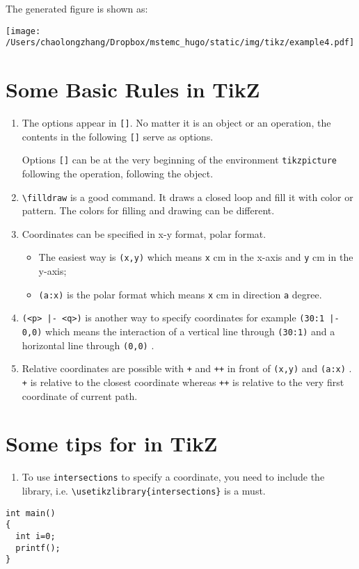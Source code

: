 \documentclass[koma,a4paper,utopia,12pt,listings-color,microtype,paralist,colorlinks,urlcolor=red]{org-article}
\begin{document}
The generated figure is shown as:
\begin{center}
\texttt{[image: /Users/chaolongzhang/Dropbox/mstemc\_hugo/static/img/tikz/example4.pdf]}
\end{center}


\section{Some Basic Rules in TikZ}
\label{sec:org628b561}


\begin{enumerate}
\item The options appear in \texttt{[]}. No matter it is an object or an operation, the
contents in the following  \texttt{[]} serve as options.

Options \texttt{[]} can be at the very beginning of the environment \texttt{tikzpicture}
following the operation, following the object.

\item \texttt{\textbackslash{}filldraw} is a good command. It draws a closed loop and fill it with color or
pattern. The colors for filling and drawing can be different.

\item Coordinates can be specified in x-y format, polar format.
\begin{itemize}
\item The easiest way is \texttt{(x,y)} which means \texttt{x} cm in the x-axis and \texttt{y} cm in the
y-axis;
\item \texttt{(a:x)} is the polar format which means \texttt{x} cm in direction \texttt{a} degree.
\end{itemize}
\item \texttt{(<p> |- <q>)} is another way to specify coordinates for example \texttt{(30:1 |- 0,0)}
which means the interaction of a vertical line through \texttt{(30:1)} and a
horizontal line through \texttt{(0,0)} .
\item Relative coordinates are possible with \texttt{+} and \texttt{++} in front of \texttt{(x,y)} and \texttt{(a:x)} .
\texttt{+} is relative to the closest coordinate whereas \texttt{++} is relative to the very
first coordinate of current path.
\end{enumerate}

\section{Some tips for in TikZ}
\label{sec:org924da02}


\begin{enumerate}
\item To use \texttt{intersections} to specify a coordinate, you need to include the
library, i.e. \texttt{\textbackslash{}usetikzlibrary\{intersections\}} is a must.
\end{enumerate}


\lstset{language=C,label= ,caption= ,captionpos=b,firstnumber=1,numbers=left}
\begin{lstlisting}
int main()
{
  int i=0;
  printf();
}
\end{lstlisting}



\end{document}
